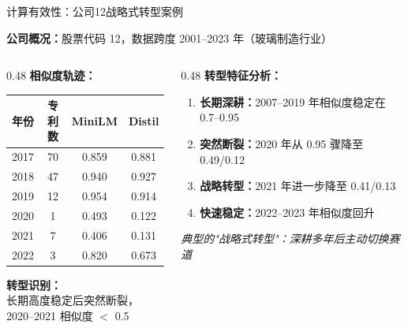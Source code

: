 \documentclass[aspectratio=169]{beamer}
\begin{document}
\begin{frame}{计算有效性：公司12战略式转型案例}

\textbf{公司概况：}股票代码 12，数据跨度 2001--2023 年（玻璃制造行业）

\vspace{0.3cm}

\begin{columns}[T]
\begin{column}{0.48\textwidth}
\textbf{相似度轨迹：}

\vspace{0.2cm}

\small
\begin{tabular}{cccc}
\toprule
年份 & 专利数 & MiniLM & Distil \\
\midrule
2017 & 70 & 0.859 & 0.881 \\
2018 & 47 & 0.940 & 0.927 \\
2019 & 12 & 0.954 & 0.914 \\
\rowcolor{red!15}
2020 & 1 & 0.493 & 0.122 \\
\rowcolor{red!15}
2021 & 7 & 0.406 & 0.131 \\
2022 & 3 & 0.820 & 0.673 \\
\bottomrule
\end{tabular}

\vspace{0.3cm}

\normalsize
\textbf{转型识别：}\\
长期高度稳定后突然断裂，\\
2020--2021 相似度 $<$ 0.5
\end{column}

\begin{column}{0.48\textwidth}
\textbf{转型特征分析：}

\vspace{0.2cm}

\begin{enumerate}
    \item \textbf{长期深耕：}2007--2019 年相似度稳定在 0.7--0.95
    \item \textbf{突然断裂：}2020 年从 0.95 骤降至 0.49/0.12
    \item \textbf{战略转型：}2021 年进一步降至 0.41/0.13
    \item \textbf{快速稳定：}2022--2023 年相似度回升
\end{enumerate}

\vspace{0.2cm}

\textit{典型的"战略式转型"：深耕多年后主动切换赛道}
\end{column}
\end{columns}

\end{frame}
\end{document}
